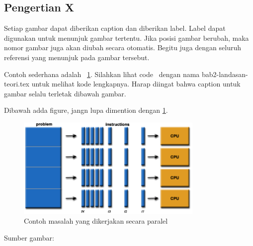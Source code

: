 \subsection{Pengertian X}
Setiap gambar dapat diberikan caption dan diberikan label. Label dapat digunakan untuk menunjuk gambar tertentu. Jika posisi gambar berubah, maka nomor gambar juga akan diubah secara 
otomatis. Begitu juga dengan seluruh referensi yang menunjuk pada gambar tersebut. 

Contoh sederhana adalah \pic~\ref{fig:exmasalahparalel}. Silahkan lihat code \latex~dengan nama bab2-landasan-teori.tex untuk melihat kode lengkapnya. Harap diingat bahwa caption untuk gambar selalu terletak dibawah gambar. 

Dibawah adda figure, jangn lupa dimention dengan \ref{fig:exmasalahparalel}. 

\begin{figure}
	\centering
	\includegraphics[width=0.8\textwidth]
		{pics/parallelProblem.png}
	\caption{Contoh masalah yang dikerjakan secara paralel}
	\label{fig:exmasalahparalel}
\end{figure}
\vspace{-0.8cm}
\begin{center}
{\small Sumber gambar: \citep{net.oxford}}
\end{center}

